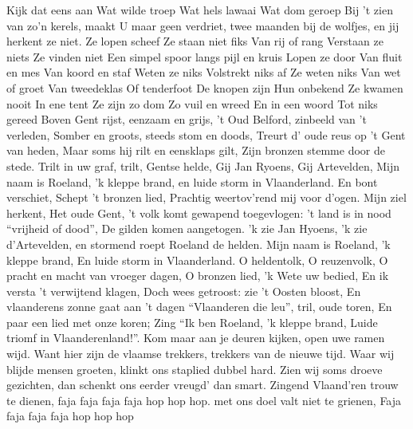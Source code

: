 \documentclass{article}
\begin{document}
\begin{songs}{}
\beginverse*
Kijk dat eens aan 
Wat wilde troep 
Wat hels lawaai 
Wat dom geroep
\endverse
\beginchorus
Bij 't zien van zo’n kerels,
maakt U maar geen verdriet,
twee maanden bij de wolfjes,
en jij herkent ze niet.
\endchorus
\beginverse*
Ze lopen scheef 
Ze staan niet fiks 
Van rij of rang 
Verstaan ze niets 
\endverse
\beginverse*
Ze vinden niet 
Een simpel spoor 
langs pijl en kruis 
Lopen ze door 
\endverse
\beginverse*
Van fluit en mes 
Van koord en staf 
Weten ze niks 
Volstrekt niks af 
\endverse
\beginverse*
Ze weten niks 
Van wet of groet 
Van tweedeklas 
Of tenderfoot 
\endverse
\beginverse*
De knopen zijn 
Hun onbekend 
Ze kwamen nooit 
In ene tent 
\endverse
\beginverse*
Ze zijn zo dom 
Zo vuil en wreed 
En in een woord 
Tot niks gereed 
\endverse
\endsong
{}
\beginverse*
Boven Gent rijst, eenzaam en grijs,
't Oud Belford, zinbeeld van 't verleden,
Somber en groots, steeds stom en doods,
Treurt d’ oude reus op 't Gent van heden,
Maar soms hij rilt en eensklaps gilt,
Zijn bronzen stemme door de stede.
Trilt in uw graf, trilt, Gentse helde,
Gij Jan Ryoens, Gij Artevelden,
Mijn naam is Roeland, 'k kleppe brand,
en luide storm in Vlaanderland.
\endverse
\beginverse*
En bont verschiet, Schept 't bronzen lied,
Prachtig weertov’rend mij voor d’ogen.
Mijn ziel herkent, Het oude Gent,
't volk komt gewapend toegevlogen:
't land is in nood “vrijheid of dood”,
De gilden komen aangetogen.
'k zie Jan Hyoens, 'k zie d’Artevelden,
en stormend roept Roeland de helden.
Mijn naam is Roeland, 'k kleppe brand,
En luide storm in Vlaanderland.
\endverse
\beginverse*
O heldentolk, O reuzenvolk,
O pracht en macht van vroeger dagen,
O bronzen lied, 'k Wete uw bedied,
En ik versta 't verwijtend klagen,
Doch wees getroost: zie 't Oosten bloost,
En vlaanderens zonne gaat aan 't dagen
“Vlaanderen die leu”, tril, oude toren,
En paar een lied met onze koren;
Zing “Ik ben Roeland, 'k kleppe brand,
Luide triomf in Vlaanderenland!”.
\endverse
\endsong
{}
\beginverse*
Kom maar aan je deuren kijken,
open uwe ramen wijd.
Want hier zijn de vlaamse trekkers,
trekkers van de nieuwe tijd.
Waar wij blijde mensen groeten,
klinkt ons staplied dubbel hard.
Zien wij soms droeve gezichten,
dan schenkt ons eerder vreugd’ dan smart.
Zingend Vlaand’ren trouw te dienen,
faja faja faja faja hop hop hop.
met ons doel valt niet te grienen,
Faja faja faja faja hop hop hop


\end{songs}
\end{document}
